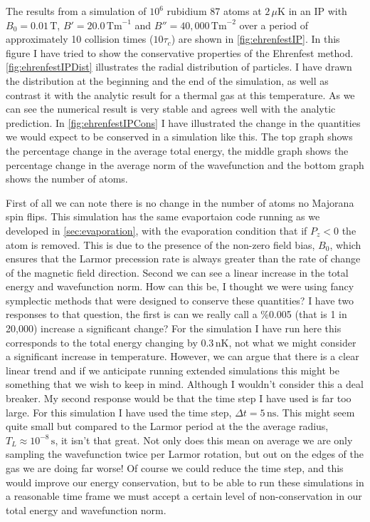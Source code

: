 The results from a simulation of $10^6$ rubidium 87 atoms at $2\,\mu\mathrm{K}$ in an IP with $B_0=0.01\,\mathrm{T}$, $B'=20.0\,\mathrm{Tm}^{-1}$ and $B''=40,000\,\mathrm{Tm}^{-2}$ over a period of approximately 10 collision times ($10\tau_c$) are shown in \autoref{fig:ehrenfestIP}.
In this figure I have tried to show the conservative properties of the Ehrenfest method.
\autoref{fig:ehrenfestIPDist} illustrates the radial distribution of particles.
I have drawn the distribution at the beginning and the end of the simulation, as well as contrast it with the analytic result for a thermal gas at this temperature.
As we can see the numerical result is very stable and agrees well with the analytic prediction.
In \autoref{fig:ehrenfestIPCons} I have illustrated the change in the quantities we would expect to be conserved in a simulation like this.
The top graph shows the percentage change in the average total energy, the middle graph shows the percentage change in the average norm of the wavefunction and the bottom graph shows the number of atoms.

First of all we can note there is no change in the number of atoms \ie no Majorana spin flips.
This simulation has the same evaportaion code running as we developed in \autoref{sec:evaporation}, with the evaporation condition that if $P_z < 0$ the atom is removed.
This is due to the presence of the non-zero field bias, $B_0$, which ensures that the Larmor precession rate is always greater than the rate of change of the magnetic field direction.
Second we can see a linear increase in the total energy and wavefunction norm.
How can this be, I thought we were using fancy symplectic methods that were designed to conserve these quantities?
I have two responses to that question, the first is can we really call a \%0.005 (that is 1 in 20,000) increase a significant change?
For the simulation I have run here this corresponds to the total energy changing by $0.3\,\mathrm{nK}$, not what we might consider a significant increase in temperature.
However, we can argue that there is a clear linear trend and if we anticipate running extended simulations this might be something that we wish to keep in mind.
Although I wouldn't consider this a deal breaker.
My second response would be that the time step I have used is far too large.
For this simulation I have used the time step, $\Delta t = 5\,\mathrm{ns}$.
This might seem quite small but compared to the Larmor period at the the average radius, $T_L\approx 10^{-8}\,\mathrm{s}$, it isn't that great.
Not only does this mean on average we are only sampling the wavefunction twice per Larmor rotation, but out on the edges of the gas we are doing far worse!
Of course we could reduce the time step, and this would improve our energy conservation, but to be able to run these simulations in a reasonable time frame we must accept a certain level of non-conservation in our total energy and wavefunction norm.

